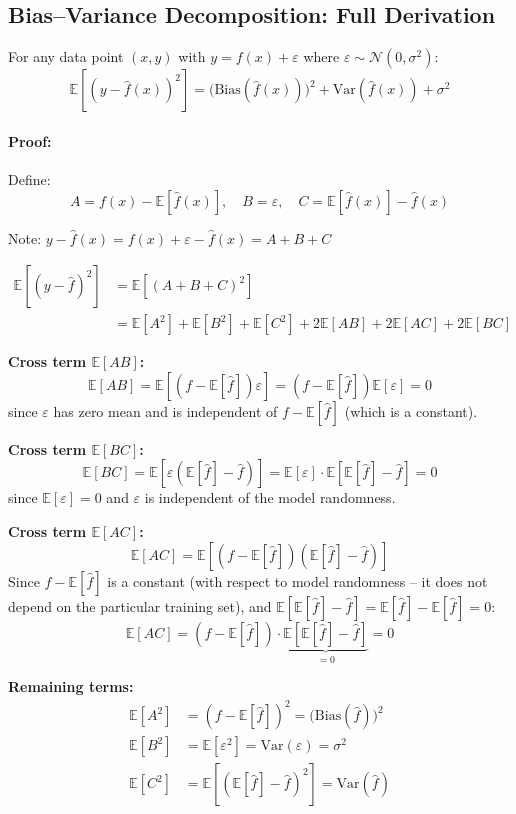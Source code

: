 \documentclass[12pt,a4paper]{article}
\newcommand{\E}{\mathbb{E}}
\newcommand{\Var}{\mathrm{Var}}
\newcommand{\Bias}{\mathrm{Bias}}
\begin{document}
\subsection{Bias--Variance Decomposition: Full Derivation}

\begin{theorembox}[title={Bias--Variance Decomposition}]
For any data point $(x, y)$ with $y = f(x) + \varepsilon$ where $\varepsilon \sim \mathcal{N}(0, \sigma^2)$:
\[
  \E\!\left[(y - \hat{f}(x))^2\right]
  = \bigl(\Bias(\hat{f}(x))\bigr)^2 + \Var(\hat{f}(x)) + \sigma^2
\]
\end{theorembox}

\paragraph{Proof:} Define:
\[
  A = f(x) - \E[\hat{f}(x)],\quad
  B = \varepsilon,\quad
  C = \E[\hat{f}(x)] - \hat{f}(x)
\]

Note: $y - \hat{f}(x) = f(x) + \varepsilon - \hat{f}(x) = A + B + C$

\begin{align*}
  \E[(y-\hat{f})^2]
  &= \E\!\left[(A+B+C)^2\right]\\
  &= \E[A^2] + \E[B^2] + \E[C^2]
    + 2\E[AB] + 2\E[AC] + 2\E[BC]
\end{align*}

\textbf{Cross term $\E[AB]$:}
\[
  \E[AB] = \E[(f - \E[\hat{f}])\varepsilon]
  = (f-\E[\hat{f}])\E[\varepsilon] = 0
\]
since $\varepsilon$ has zero mean and is independent of $f - \E[\hat{f}]$ (which is a constant).

\textbf{Cross term $\E[BC]$:}
\[
  \E[BC] = \E[\varepsilon(\E[\hat{f}] - \hat{f})]
  = \E[\varepsilon]\cdot\E[\E[\hat{f}]-\hat{f}] = 0
\]
since $\E[\varepsilon]=0$ and $\varepsilon$ is independent of the model randomness.

\textbf{Cross term $\E[AC]$:}
\[
  \E[AC] = \E[(f-\E[\hat{f}])(\E[\hat{f}]-\hat{f})]
\]
Since $f - \E[\hat{f}]$ is a constant (with respect to model randomness -- it does not depend on the particular training set), and $\E[\E[\hat{f}]-\hat{f}] = \E[\hat{f}] - \E[\hat{f}] = 0$:
\[
  \E[AC] = (f - \E[\hat{f}])\cdot\underbrace{\E[\E[\hat{f}]-\hat{f}]}_{=0} = 0
\]

\textbf{Remaining terms:}
\begin{align*}
  \E[A^2] &= (f - \E[\hat{f}])^2 = \bigl(\Bias(\hat{f})\bigr)^2\\
  \E[B^2] &= \E[\varepsilon^2] = \Var(\varepsilon) = \sigma^2\\
  \E[C^2] &= \E\!\left[(\E[\hat{f}] - \hat{f})^2\right] = \Var(\hat{f})
\end{align*}
\end{document}
